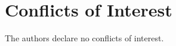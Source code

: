 \documentclass[10pt,a4paper]{article}
\newcommand{\conflictsofinterest}[1]{\section*{Conflicts of Interest}#1}
\newcommand{\reftitle}[1]{\renewcommand{\refname}{#1}}
\newcommand{\externalbibliography}[1]{}
\newcommand{\printendnotes}[1][]{}
\newenvironment{adjustwidth}[2]{}{}
\providecommand{\extralength}{0pt}
\begin{document}
\conflictsofinterest{The authors declare no conflicts of interest.}


\begin{adjustwidth}{-\extralength}{0cm}
\printendnotes[custom]
\end{adjustwidth}

\reftitle{References}
\externalbibliography{yes}
\ifpreview\fi

\end{document}
